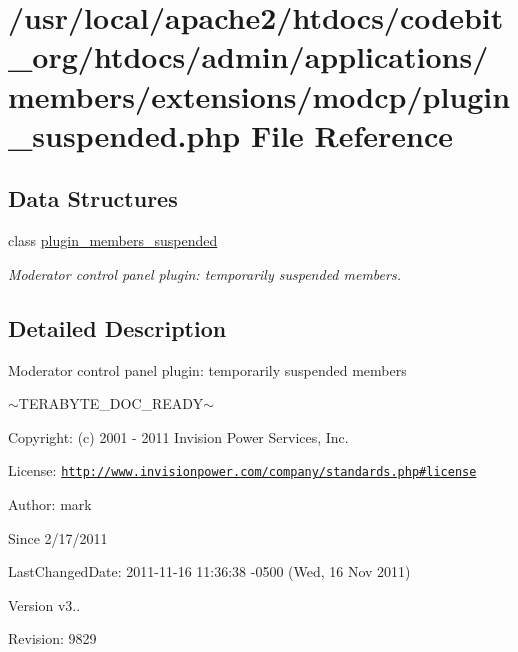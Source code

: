 \hypertarget{plugin__suspended_8php}{\section{/usr/local/apache2/htdocs/codebit\-\_\-org/htdocs/admin/applications/members/extensions/modcp/plugin\-\_\-suspended.php File Reference}
\label{plugin__suspended_8php}
}
\subsection*{Data Structures}
\begin{DoxyCompactItemize}
\item 
class \hyperlink{classplugin__members__suspended}{plugin\-\_\-members\-\_\-suspended}
\begin{DoxyCompactList}\small\item\em Moderator control panel plugin\-: temporarily suspended members. \end{DoxyCompactList}\end{DoxyCompactItemize}


\subsection{Detailed Description}
\begin{DoxyVerb}  Moderator control panel plugin: temporarily suspended members
\end{DoxyVerb}
 $\sim$\-T\-E\-R\-A\-B\-Y\-T\-E\-\_\-\-D\-O\-C\-\_\-\-R\-E\-A\-D\-Y$\sim$ \begin{DoxyParagraph}{Copyright\-:}
(c) 2001 -\/ 2011 Invision Power Services, Inc.
\end{DoxyParagraph}
\begin{DoxyParagraph}{License\-:}
\href{http://www.invisionpower.com/company/standards.php#license}{\tt http\-://www.\-invisionpower.\-com/company/standards.\-php\#license}
\end{DoxyParagraph}
\begin{DoxyParagraph}{Author\-:}
mark 
\end{DoxyParagraph}
\begin{DoxySince}{Since}
2/17/2011 
\end{DoxySince}
\begin{DoxyParagraph}{Last\-Changed\-Date\-:}
2011-\/11-\/16 11\-:36\-:38 -\/0500 (Wed, 16 Nov 2011) 
\end{DoxyParagraph}
\begin{DoxyVersion}{Version}
v3.. 
\end{DoxyVersion}
\begin{DoxyParagraph}{Revision\-:}
9829 
\end{DoxyParagraph}
